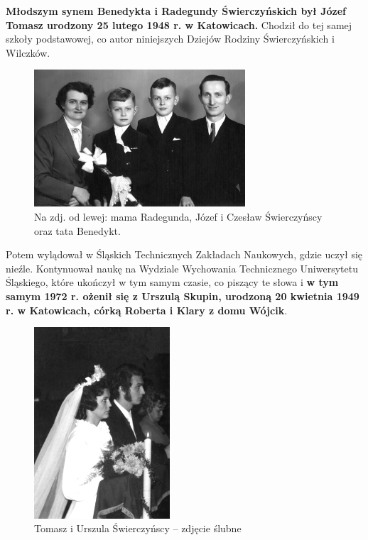\textbf{Młodszym synem Benedykta i Radegundy Świerczyńskich był Józef Tomasz urodzony 25 lutego 1948 r. w Katowicach.} Chodził do tej samej szkoły podstawowej, co autor niniejszych Dziejów Rodziny Świerczyńskich i Wilczków. 
\begin{figure}[!h]
\begin{center}
\includegraphics[width=0.7\textwidth]{photo/jozef_tomasz_swierczynski_komunia.jpg}
\caption[I Komunia św. Józefa Tomasza]{Na zdj. od lewej: mama Radegunda, Józef i Czesław Świerczyńscy oraz tata Benedykt.}
\end{center}
\end{figure}

Potem wylądował w Śląskich Technicznych Zakładach Naukowych, gdzie uczył się nieźle. Kontynuował naukę na Wydziale Wychowania Technicznego Uniwersytetu Śląskiego, które ukończył w tym samym czasie, co piszący te słowa i \textbf{w tym samym 1972 r. ożenił się z Urszulą Skupin, urodzoną 20 kwietnia 1949 r. w Katowicach, córką Roberta i Klary z domu Wójcik}.
\begin{figure}[!h]
\begin{center}
\includegraphics[width=0.45\textwidth]{photo/tomasz_urszula_swierczynscy_slub.jpg}
\caption{Tomasz i Urszula Świerczyńscy -- zdjęcie ślubne}
\end{center}
\end{figure}


